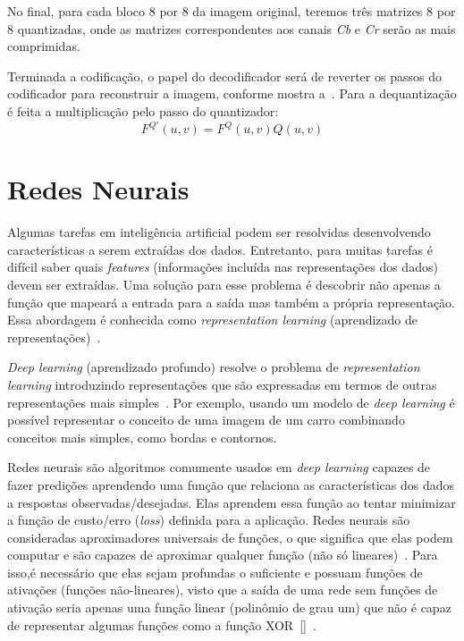 No final, para cada bloco 8 por 8 da imagem original, teremos três matrizes 8 por 8 quantizadas, onde as matrizes correspondentes aos canais \textit{Cb} e \textit{Cr} serão as mais comprimidas.

Terminada a codificação, o papel do decodificador será de reverter os passos do codificador para reconstruir a imagem, conforme mostra a~. Para a dequantização é feita a multiplicação pelo passo do quantizador: $$F^{Q'}(u,v) = F^Q(u,v)Q(u,v)$$ 
\section{Redes Neurais}
Algumas tarefas em inteligência artificial podem ser resolvidas desenvolvendo características a serem extraídas dos dados. Entretanto, para muitas tarefas é difícil saber quais \textit{features} (informações incluída nas representações dos dados) devem ser extraídas. Uma solução para esse problema é descobrir não apenas a função que mapeará a entrada para a saída mas também a própria representação. Essa abordagem é conhecida como \textit{representation learning} (aprendizado de representações)~\cite{deeplearning}.

\textit{Deep learning} (aprendizado profundo) resolve o problema de \textit{representation learning} introduzindo representações que são expressadas em termos de outras representações mais simples~\cite{deeplearning}. Por exemplo, usando um modelo de \textit{deep learning} é possível representar o conceito de uma imagem de um carro combinando conceitos mais simples, como bordas e contornos.

Redes neurais são algoritmos comumente usados em \textit{deep learning} capazes de fazer predições aprendendo uma função que relaciona as características dos dados a respostas observadas/desejadas. Elas aprendem essa função ao tentar minimizar a função de custo/erro (\textit{loss}) definida para a aplicação. Redes neurais são consideradas aproximadores universais de funções, o que significa que elas podem computar e são capazes de aproximar qualquer função (não só lineares)~\cite{dlbook}. Para isso,é necessário que elas sejam profundas o suficiente e possuam funções de ativações (funções não-lineares), visto que a saída de uma rede sem funções de ativação seria apenas uma função linear (polinômio de grau um) que não é capaz de representar algumas funções como a função \acrshort{XOR}~[]~\cite{deeplearning}. 

